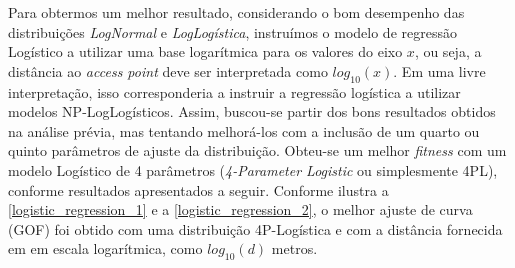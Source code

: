 \documentclass[
	12pt,				%
	twoside,			%
	a4paper,			%
	english,			%
	french,				%
	spanish,			%
	brazil				%
	]{abntex2}
\begin{document}
Para obtermos um melhor resultado, considerando o bom desempenho das
distribuições \emph{LogNormal} e \emph{LogLogística}, instruímos o
modelo de regressão Logístico a utilizar uma base logarítmica para os
valores do eixo \(x\), ou seja, a distância ao \emph{access point} deve
ser interpretada como \(log_{10}(x)\). Em uma livre interpretação, isso
corresponderia a instruir a regressão logística a utilizar modelos
NP-LogLogísticos. Assim, buscou-se partir dos bons resultados obtidos na
análise prévia, mas tentando melhorá-los com a inclusão de um quarto ou
quinto parâmetros de ajuste da distribuição. Obteu-se um melhor
\emph{fitness} com um modelo Logístico de 4 parâmetros
(\emph{4-Parameter Logistic} ou simplesmente 4PL), conforme resultados
apresentados a seguir. Conforme ilustra a
\autoref{logistic_regression_1} e a \autoref{logistic_regression_2}, o
melhor ajuste de curva (GOF) foi obtido com uma distribuição
4P-Logística e com a distância fornecida em em escala logarítmica, como
\(log_{10}(d)\) metros.
\end{document}
